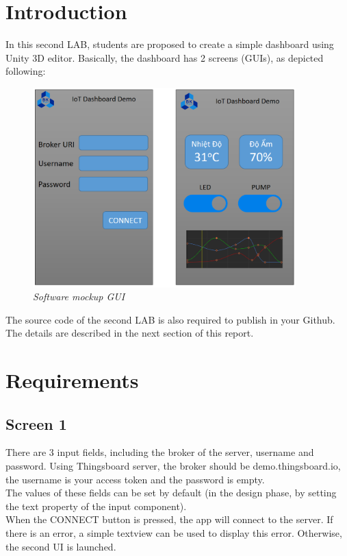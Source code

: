 \documentclass[a4paper,11pt]{article}
\theoremstyle{mytheor}
\begin{document}
\renewcommand{\contentsname}{Content}
\newpage
\vspace{1cm}
\tableofcontents
\newpage

\section{Introduction}
In this second LAB, students are proposed to create a simple dashboard using Unity 3D editor. Basically, the dashboard has 2 screens (GUIs), as depicted following:
\begin{figure}[!htp]
    \centering
    \includegraphics[width=4in]{Lab2_Demo.png}
    \caption{\textit{Software mockup GUI}}
    \label{}
\end{figure}

The source code of the second LAB is also required to publish in your Github. The details are described in the next section of this report.

\section{Requirements}
\subsection{Screen 1}
There are 3 input fields, including the broker of the server, username and password. Using Thingsboard server, the broker should be demo.thingsboard.io, the username is your access token and the password is empty.\\

The values of these fields can be set by default (in the design phase, by setting the text property of the input component).\\

When the CONNECT button is pressed, the app will connect to the server. If there is an error, a simple textview can be used to display this error. Otherwise, the second UI is launched.
\end{document}
